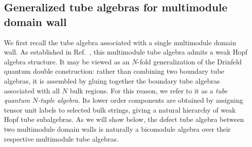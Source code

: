 \documentclass[a4paper,11pt]{article}
\theoremstyle{definition}
\theoremstyle{remark}
\begin{document}
\subsection{Generalized tube algebras for multimodule domain wall}

We first recall the tube algebra associated with a single multimodule domain wall. As established in Ref.~\cite{jia2025tube}, this multimodule tube algebra admits a weak Hopf algebra structure. It may be viewed as an $N$-fold generalization of the Drinfeld quantum double construction: rather than combining two boundary tube algebras, it is assembled by gluing together the boundary tube algebras associated with all $N$ bulk regions. For this reason, we refer to it as a \emph{tube quantum $N$-tuple algebra}. Its lower order components are obtained by assigning tensor unit labels to selected bulk strings, giving a natural hierarchy of weak Hopf tube subalgebras. As we will show below, the defect tube algebra between two multimodule domain walls is naturally a bicomodule algebra over their respective multimodule tube algebras.
\end{document}
